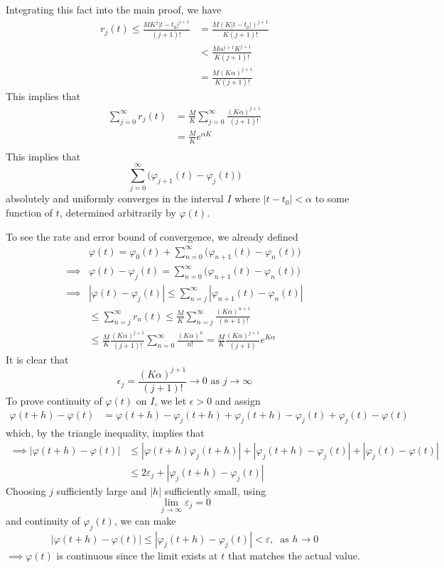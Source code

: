 \documentclass{article}
\theoremstyle{remark}
\theoremstyle{definition}
\begin{document}
    Integrating this fact into the main proof, we have
    \begin{align*}
        r_j (t) \leq \frac{M K^j |t - t_0|^{j+1}}{(j+1)!} & = \frac{M (K |t - t_0|)^{j+1}}{K (j+1)!}\\
        & < \frac{M \alpha^{j+1} K^{j+1}}{K (j+1)!} \\
        & = \frac{M (K \alpha)^{j+1}}{K (j+1)!} 
    \end{align*}
    This implies that
    \begin{align*}
        \sum_{j=0}^\infty r_j (t) & = \frac{M}{K} \sum_{j=0}^\infty \frac{ (K \alpha)^{j+1}}{(j+1)!} \\
        & = \frac{M}{K} e^{\alpha K} \\
    \end{align*}
    This implies that 
    \[\sum_{j=0}^\infty \big( \varphi_{j+1} (t) - \varphi_{j} (t) \big)\]
    absolutely and uniformly converges in the interval $I$ where $|t - t_0| < \alpha$ to some function of $t$, determined arbitrarily by $\varphi (t)$. 

    To see the rate and error bound of convergence, we already defined
    \begin{align*}
        & \varphi(t) = \varphi_0 (t) + \sum_{n=0}^\infty \big(\varphi_{n+1} (t) - \varphi_n (t)\big) \\
        \implies & \varphi (t) - \varphi_j (t) = \sum_{n=0}^\infty \big(\varphi_{n+1} (t) - \varphi_n (t)\big) \\
        \implies & |\varphi(t) - \varphi_j (t)| \leq \sum_{n=j}^\infty |\varphi_{n+1} (t) - \varphi_n (t)| \\
        & \leq \sum_{n=j}^\infty r_n (t) \leq \frac{M}{K} \sum_{n=j}^\infty \frac{(K \alpha)^{n+1}}{(n+1)!} \\
        & \leq \frac{M}{K} \frac{(K \alpha)^{j+1}}{(j+1)!} \sum_{n=0}^\infty \frac{(K\alpha)^n}{n!} = \frac{M}{K} \frac{(K\alpha)^{j+1}}{(j+1)} e^{K \alpha}
    \end{align*}
    It is clear that 
    \[\epsilon_j = \frac{(K \alpha)^{j+1}}{(j+1)!} \rightarrow 0 \text{ as } j \rightarrow \infty\]
    To prove continuity of $\varphi(t)$ on $I$, we let $\epsilon > 0$ and assign 
    \begin{align*}
        \varphi(t+h) - \varphi(t) & = \varphi(t+h) - \varphi_j (t+h) + \varphi_j (t+h) - \varphi_j (t) + \varphi_j (t) - \varphi(t) 
    \end{align*}
    which, by the triangle inequality, implies that
    \begin{align*}
        \implies |\varphi(t+h) - \varphi(t)| & \leq |\varphi(t+h) \varphi_j  (t+h)| + |\varphi_j (t+h) - \varphi_j (t)| + |\varphi_j (t) - \varphi(t)| \\
        & \leq 2 \varepsilon_j + |\varphi_j (t+h) - \varphi_j (t)| 
    \end{align*}
    Choosing $j$ sufficiently large and $|h|$ sufficiently small, using 
    \[\lim_{j \rightarrow \infty} \varepsilon_j = 0\]
    and continuity of $\varphi_j (t)$, we can make
    \[|\varphi(t+h) - \varphi(t)| \leq |\varphi_j (t+h) - \varphi_j (t)| < \varepsilon, \;\; \text{as } h \rightarrow 0\]
    $\implies \varphi(t)$ is continuous since the limit exists at $t$ that matches the actual value. 
\end{document}
